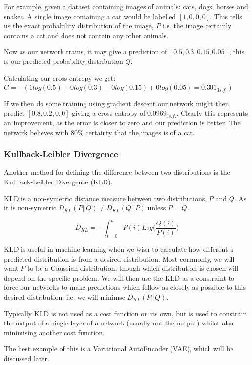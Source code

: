 For example, given a dataset containing images of animals: cats, dogs, horses and snakes. A single image containing a cat would be labelled $[1, 0, 0, 0]$. This tells us the exact probability distribution of the image, $P$ i.e. the image certainly contains a cat and does not contain any other animals.

Now as our network trains, it may give a prediction of $[0.5, 0.3, 0.15, 0.05]$, this is our predicted probability distribution $Q$.

Calculating our cross-entropy we get:
$C = -(1 log(0.5) + 0 log(0.3) + 0 log(0.15) + 0 log(0.05) = 0.301_{3s.f.})$


If we then do some training using gradient descent our network might then predict $[0.8, 0.2, 0, 0]$ giving a cross-entropy of $0.0969_{3s.f.}$. Clearly this represents an improvement, as the error is closer to zero and our prediction is better. The network believes with 80\% certainty that the images is of a cat. 


\subsubsection{Kullback-Leibler Divergence}

Another method for defining the difference between two distributions is the Kullback-Leibler Divergence (KLD).

KLD is a non-symetric distance measure between two distributions, $P$ and $Q$. As it is non-symetric $D_{KL}(P||Q) \neq D_{KL}(Q||P)$ unless $P = Q$.

\begin{equation} \label{eqn:kld}
D_{KL} = -\int_{i=0}^{n}{P(i)Log(\frac{Q(i)}{P(i)}})
\end{equation}

KLD is useful in machine learning when we wish to calculate how different a predicted distribution is from a desired distribution. Most commonly, we will want $P$ to be a Gaussian distribution, though which distribution is chosen will depend on the specific problem. We will then use the KLD as a constraint to force our networks to make predictions which follow as closely as possible to this desired distribution, i.e. we will minimse $D_{KL}(P||Q)$.

Typically KLD is not used as a cost function on its own, but is used to constrain the output of a single layer of a network (usually not the output) whilst also minimising another cost function.

The best example of this is a Variational AutoEncoder (VAE), which will be discussed later.


